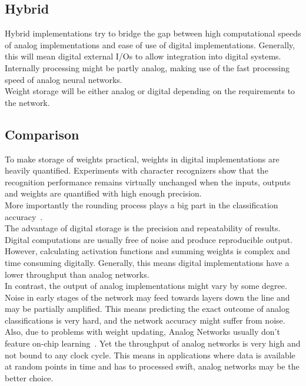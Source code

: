 \documentclass[conference]{IEEEtran}
\begin{document}
    \subsection{Hybrid}

    Hybrid implementations try to bridge the gap between high computational speeds of analog implementations and ease of use of digital implementations.
    Generally, this will mean digital external I/Os to allow integration into digital systems.\\
    Internally processing might be partly analog, making use of the fast processing speed of analog neural networks.\\
    Weight storage will be either analog or digital depending on the requirements to the network.

    \subsection{Comparison}

    To make storage of weights practical, weights in digital implementations are heavily quantified.
    Experiments with character recognizers show that the recognition performance remains virtually unchanged when the inputs, outputs and
    weights are quantified with high enough precision.\\
    More importantly the rounding process plays a big part in the classification accuracy~\cite{gupta2015deep}.\\
    The advantage of digital storage is the precision and repeatability of results.
    Digital computations are usually free of noise and produce reproducible output.
    However, calculating activation functions and summing weights is complex and time consuming digitally.
    Generally, this means digital implementations have a lower throughput than analog networks.\\

    In contrast, the output of analog implementations might vary by some degree.
    Noise in early stages of the network may feed towards layers down the line and may be partially amplified.
    This means predicting the exact outcome of analog classifications is very hard, and the network accuracy might suffer from noise.
    Also, due to problems with weight updating, Analog Networks usually don't feature on-chip learning~\cite{ms1990digital}.
    Yet the throughput of analog networks is very high and not bound to any clock cycle.
    This means in applications where data is available at random points in time and has to processed swift, analog networks may be the better choice.
\end{document}
